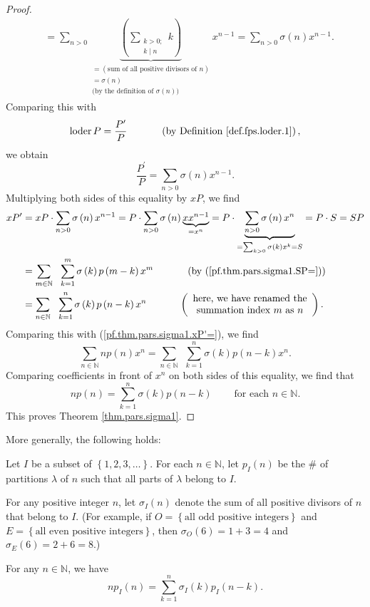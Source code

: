 \begin{proof}
\begin{align*}
&  =\sum_{n>0}\underbrace{\left(  \sum_{\substack{k>0;\\k\mid n}}k\right)
}_{\substack{=\left(  \text{sum of all positive divisors of }n\right)
\\=\sigma\left(  n\right)  \\\text{(by the definition of }\sigma\left(
n\right)  \text{)}}}x^{n-1}=\sum_{n>0}\sigma\left(  n\right)  x^{n-1}.
\end{align*}
Comparing this with%
\[
\operatorname*{loder}P=\dfrac{P^{\prime}}{P}\ \ \ \ \ \ \ \ \ \ \left(
\text{by Definition \ref{def.fps.loder.1}}\right)  ,
\]
we obtain
\[
\dfrac{P^{\prime}}{P}=\sum_{n>0}\sigma\left(  n\right)  x^{n-1}.
\]
Multiplying both sides of this equality by $xP$, we find%
\begin{align*}
xP^{\prime}  &  =xP\cdot\sum_{n>0}\sigma\left(  n\right)  x^{n-1}=P\cdot
\sum_{n>0}\sigma\left(  n\right)  \underbrace{xx^{n-1}}_{=x^{n}}%
=P\cdot\underbrace{\sum_{n>0}\sigma\left(  n\right)  x^{n}}_{=\sum_{k>0}%
\sigma\left(  k\right)  x^{k}=S}=P\cdot S=SP\\
&  =\sum_{m\in\mathbb{N}}\ \ \sum_{k=1}^{m}\sigma\left(  k\right)  p\left(
m-k\right)  x^{m}\ \ \ \ \ \ \ \ \ \ \left(  \text{by
(\ref{pf.thm.pars.sigma1.SP=})}\right) \\
&  =\sum_{n\in\mathbb{N}}\ \ \sum_{k=1}^{n}\sigma\left(  k\right)  p\left(
n-k\right)  x^{n}\ \ \ \ \ \ \ \ \ \ \left(
\begin{array}
[c]{c}%
\text{here, we have renamed the}\\
\text{summation index }m\text{ as }n
\end{array}
\right)  .
\end{align*}
Comparing this with (\ref{pf.thm.pars.sigma1.xP'=}), we find%
\[
\sum_{n\in\mathbb{N}}np\left(  n\right)  x^{n}=\sum_{n\in\mathbb{N}}%
\ \ \sum_{k=1}^{n}\sigma\left(  k\right)  p\left(  n-k\right)  x^{n}.
\]
Comparing coefficients in front of $x^{n}$ on both sides of this equality, we
find that%
\[
np\left(  n\right)  =\sum_{k=1}^{n}\sigma\left(  k\right)  p\left(
n-k\right)  \ \ \ \ \ \ \ \ \ \ \text{for each }n\in\mathbb{N}\text{.}%
\]
This proves Theorem \ref{thm.pars.sigma1}.
\end{proof}

More generally, the following holds:

\begin{theorem}
\label{thm.pars.sigma1-I}Let $I$ be a subset of $\left\{  1,2,3,\ldots
\right\}  $. For each $n\in\mathbb{N}$, let $p_{I}\left(  n\right)  $ be the
\# of partitions $\lambda$ of $n$ such that all parts of $\lambda$ belong to
$I$.

For any positive integer $n$, let $\sigma_{I}\left(  n\right)  $ denote the
sum of all positive divisors of $n$ that belong to $I$. (For example, if
$O=\left\{  \text{all odd positive integers}\right\}  $ and $E=\left\{
\text{all even positive integers}\right\}  $, then $\sigma_{O}\left(
6\right)  =1+3=4$ and $\sigma_{E}\left(  6\right)  =2+6=8$.)

For any $n\in\mathbb{N}$, we have%
\[
np_{I}\left(  n\right)  =\sum_{k=1}^{n}\sigma_{I}\left(  k\right)
p_{I}\left(  n-k\right)  .
\]

\end{theorem}

